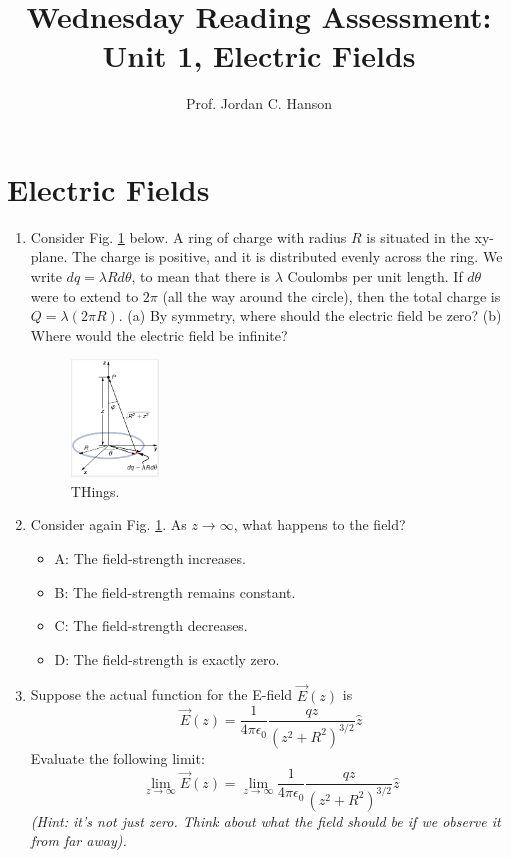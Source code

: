 \documentclass{article}
\begin{document}
\title{Wednesday Reading Assessment: Unit 1, Electric Fields}
\author{Prof. Jordan C. Hanson}

\maketitle

\section{Electric Fields}

\begin{enumerate}
\item Consider Fig. \ref{fig:ring} below.  A ring of charge with radius $R$ is situated in the xy-plane.  The charge is positive, and it is distributed evenly across the ring.  We write $dq = \lambda R d\theta$, to mean that there is $\lambda$ Coulombs per unit length.  If $d\theta$ were to extend to $2\pi$ (all the way around the circle), then the total charge is $Q = \lambda (2 \pi R)$.  (a) By symmetry, where should the electric field be zero?  (b) Where would the electric field be infinite?
\begin{figure}[ht]
\centering
\includegraphics[width=0.22\textwidth]{ring.png}
\caption{\label{fig:ring} THings.}
\end{figure}
\item Consider again Fig. \ref{fig:ring}.  As $z \rightarrow \infty$, what happens to the field?
\begin{itemize}
\item A: The field-strength increases.
\item B: The field-strength remains constant.
\item C: The field-strength decreases.
\item D: The field-strength is exactly zero.
\end{itemize}
\item Suppose the actual function for the E-field $\vec{E}(z)$ is
\begin{equation}
\vec{E}(z) = \frac{1}{4\pi \epsilon_0} \frac{q z}{\left( z^2 + R^2 \right)^{3/2}} \hat{z}
\end{equation}
Evaluate the following limit:
\begin{equation}
\lim_{z \to \infty} \vec{E}(z) = \lim_{z \to \infty} \frac{1}{4\pi \epsilon_0} \frac{q z}{\left( z^2 + R^2 \right)^{3/2}} \hat{z}
\end{equation}
\textit{(Hint: it's not just zero.  Think about what the field should be if we observe it from far away).}
\end{enumerate}
\end{document}
